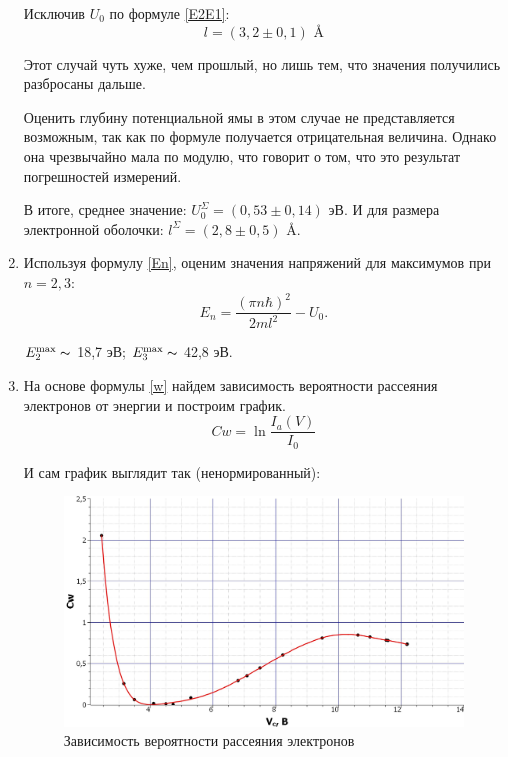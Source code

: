 \begin{enumerate}
		Исключив $U_0$ по формуле \eqref{E2E1}:
		\begin{equation*}
			l = (3,2 \pm 0,1) \text{ \AA}
		\end{equation*}
		
		Этот случай чуть хуже, чем прошлый, но лишь тем, что значения получились разбросаны дальше.
		
		Оценить глубину потенциальной ямы в этом случае не представляется возможным, так как по формуле получается отрицательная величина. Однако она чрезвычайно мала по модулю, что говорит о том, что это результат погрешностей измерений.
	
		В итоге, среднее значение: $U_0^\Sigma = (0,53 \pm 0,14)$ эВ.
		И для размера электронной оболочки: $l^\Sigma = (2,8 \pm 0,5)$ \AA.
	
	
		\item Используя формулу \eqref{En}, оценим значения напряжений для максимумов при $n = 2, 3$:
		\begin{equation*}
			E_n = \frac{(\pi n \hbar)^2}{2ml^2} - U_0.
		\end{equation*}
	
		$E_2^\text{max} \thicksim $ 18,7 эВ; $E_3^\text{max} \thicksim $ 42,8 эВ. 
	
		\item На основе формулы \eqref{w} найдем зависимость вероятности рассеяния электронов от энергии и построим график.
		\begin{equation*}
			Cw = \ln\frac{I_a(V)}{I_0}
		\end{equation*}
		
		И сам график выглядит так (ненормированный):
		\begin{figure}[h!]
			\centering
			\includegraphics[width=\linewidth]{./Pictures/Cw(V).jpg}
			\caption{Зависимость вероятности рассеяния электронов}
		\end{figure}
	
	\end{enumerate}


